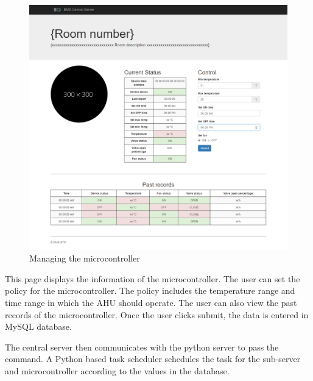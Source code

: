 \documentclass[letterpaper,11pt]{report}
\begin{document}
\newpage
\begin{figure}[h]
\includegraphics[width=\textwidth]{arduino}
\centering
\captionsetup{justification=centering}
\caption{Managing the microcontroller}
\label{fig:arduino}
\end{figure}
This page displays the information of the microcontroller. The user can set the policy for the microcontroller. The policy includes the temperature range and time range in which the AHU should operate. The user can also view the past records of the microcontroller. Once the user clicks submit, the data is entered in MySQL database.
\par
The central server then communicates with the python server to pass the command. A Python based task scheduler schedules the task for the sub-server and microcontroller according to the values in the database.

\newpage
\nocite*{}


\end{document}
